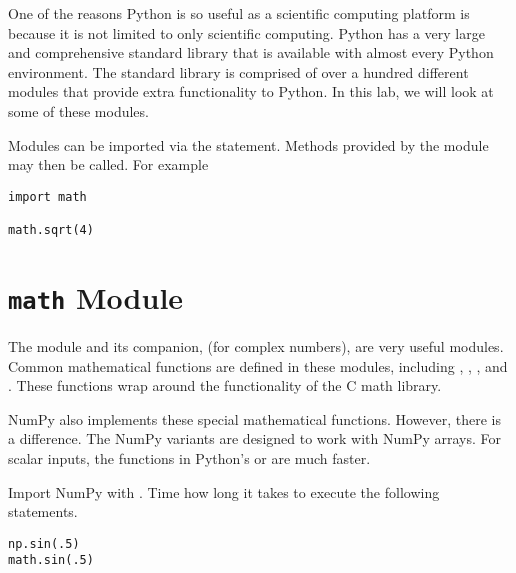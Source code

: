 
One of the reasons Python is so useful as a scientific computing platform is because it is not limited to only scientific computing.
Python has a very large and comprehensive standard library that is available with almost every Python environment.
The standard library is comprised of over a hundred different modules that provide extra functionality to Python.
In this lab, we will look at some of these modules.

Modules can be imported via the  statement. Methods provided by the module may then be called.  For example


\begin{lstlisting}
import math

math.sqrt(4)
\end{lstlisting}

\section*{\texttt{math} Module}
The  module and its companion,  (for complex numbers), are very useful modules.
Common mathematical functions are defined in these modules, including , , , and .  These functions wrap around the functionality of the C math library.

\begin{problem}
NumPy also implements these special mathematical functions.
However, there is a difference.
The NumPy variants are designed to work with NumPy arrays.
For scalar inputs, the functions in Python's  or  are much faster.

Import NumPy with .
Time how long it takes to execute the following statements.
\begin{lstlisting}
np.sin(.5)
math.sin(.5)
\end{lstlisting}
\end{problem}

